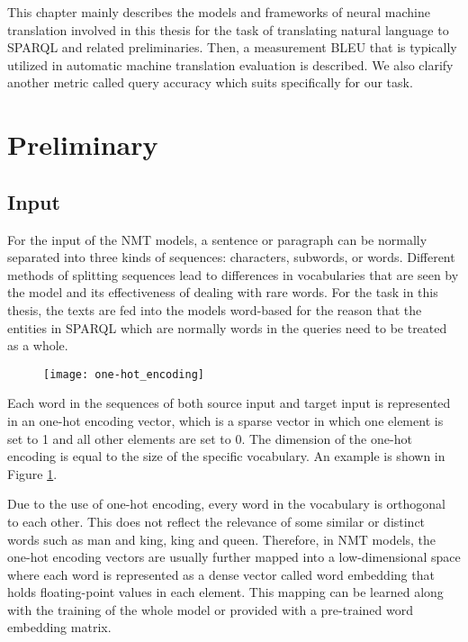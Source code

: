 
This chapter mainly describes the models and frameworks of neural machine translation involved in this thesis for the task of translating natural language to SPARQL and related preliminaries. Then, a measurement BLEU that is typically utilized in automatic machine translation evaluation is described. We also clarify another metric called query accuracy which suits specifically for our task.

\section{Preliminary}

\subsection{Input}

For the input of the NMT models, a sentence or paragraph can be normally separated into three kinds of sequences: characters, subwords, or words. Different methods of splitting sequences lead to differences in vocabularies that are seen by the model and its effectiveness of dealing with rare words. For the task in this thesis, the texts are fed into the models word-based for the reason that the entities in SPARQL which are normally words in the queries need to be treated as a whole.

\begin{figure}[h]
\texttt{[image: one-hot\_encoding]}
\centering
\caption{}
\label{figure:one-hot encoding}
\end{figure}

Each word in the sequences of both source input and target input is represented in an one-hot encoding vector, which is a sparse vector in which one element is set to 1 and all other elements are set to 0. The dimension of the one-hot encoding is equal to the size of the specific vocabulary. An example is shown in Figure \ref{figure:one-hot encoding}.

Due to the use of one-hot encoding, every word in the vocabulary is orthogonal to each other. This does not reflect the relevance of some similar or distinct words such as man and king, king and queen. Therefore, in NMT models, the one-hot encoding vectors are usually further mapped into a low-dimensional space where each word is represented as a dense vector called word embedding that holds floating-point values in each element. This mapping can be learned along with the training of the whole model or provided with a pre-trained word embedding matrix.

